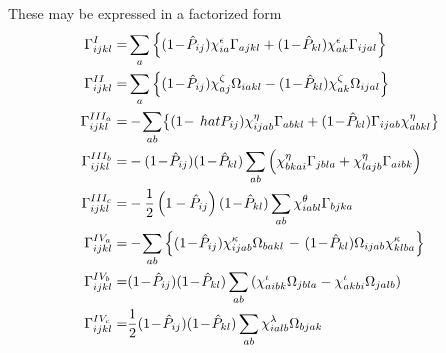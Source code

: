 \documentclass[11pt]{article}
\newcommand{\MyRomanNum}[1]{%
\ifcase#1\or I\or II\or III\or IV\or V\or VI\or VII\or VIII\or IX\or X\else #1\fi}
\begin{document}
These may be expressed in a factorized form
\begin{subequations}\allowdisplaybreaks[4]\label{Factorized_DoubleCommutator_twobody}
\begin{align}
\Gamma^{\MyRomanNum{1}}_{ijkl}  =& \sum_{a} \left\{(1\! -\! \hat P_{ij} )   \chi^{\epsilon}_{ia} \Gamma_{ajkl} %
+ (1\! -\! \hat P_{kl} )  \chi^{\epsilon}_{ak} \Gamma_{ijal}    \right\}\\
%
\Gamma^{\MyRomanNum{2}}_{ijkl}  =&\sum_{a}  \left\{
(1 \!-\! \hat P_{ij} )   \chi^{\zeta}_{aj}  \Omega_{iakl} %
-(1 \!-\! \hat P_{kl} )  \chi^{\zeta}_{ak}  \Omega_{ijal}  \right\}\\
%
\Gamma^{\MyRomanNum{3}_a}_{ijkl}  =& 
-\!\sum_{ab} \bigl\{ (1\! -\! \ hat P_{ij} ) \chi^{\eta}_{ijab}  \Gamma_{abkl} %
  + (1 \!- \!\hat P_{kl} )  \Gamma_{ijab}  \chi^{\eta}_{abkl} \bigr\} \\
%
\Gamma^{\MyRomanNum{3}_b}_{ijkl} =& - (1\! -\! \hat P_{ij}) (1\! -\! \hat P_{kl} ) %
\sum_{ab} \left( \chi^{\eta}_{bkai} \Gamma_{jbla} + \chi^{\eta}_{lajb}  \Gamma_{aibk}  \right)\\
%
\Gamma^{\MyRomanNum{3}_c}_{ijkl}  =& - \frac{1}{2} \left(1 - \hat P_{ij} \right)  (1\! - \!\hat P_{kl} ) \sum_{ab}  \chi^{\theta}_{iabl} \Gamma_{bjka}   \\
%
\Gamma^{\MyRomanNum{4}_a}_{ijkl}  =&  -\!\sum_{ab} \left\{  (1\!- \!\hat P_{ij} ) \chi^{\kappa}_{ijab} \Omega_{bakl}  \right. %
-\left.  (1\! -\! \hat P_{kl} ) \Omega_{ijab} \chi^{\kappa}_{klba} \right\}  \\
%
\Gamma^{\MyRomanNum{4}_b}_{ijkl}  =&  (1 \!- \!\hat P_{ij} )  (1 \!-\! \hat P_{kl} ) %
\sum_{ab} \left( \chi^{\iota}_{aibk} \Omega_{jbla} - \chi^{\iota}_{akbi} \Omega_{jalb}  \right ) \\
%
\Gamma^{\MyRomanNum{4}_c}_{ijkl}   =&   \frac{1}{2} (1\! -\! \hat P_{ij} ) 
 (1 \!-\! \hat P_{kl} )  \sum_{ab} \chi^{\lambda}_{ialb}  \Omega_{bjak} 
\end{align}
\end{subequations}
\end{document}
